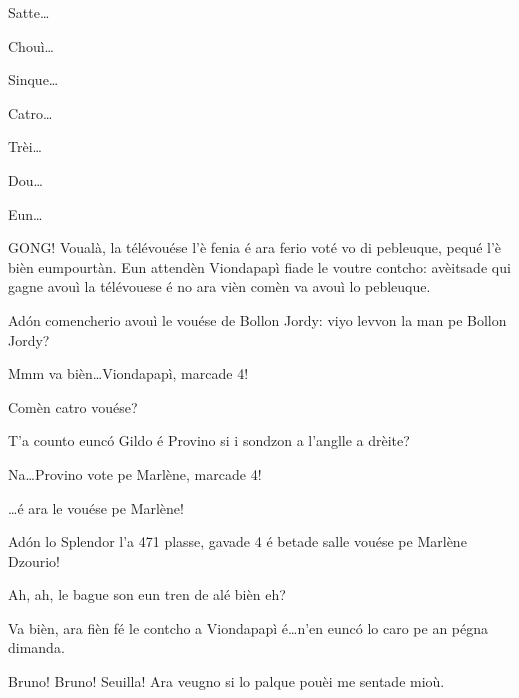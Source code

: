 \begin{drama}
\Noteospeaks Satte\ldots

\Brunospeaks Chouì\ldots

\Noteospeaks Sinque\ldots

\Brunospeaks Catro\ldots

\Noteospeaks Trèi\ldots

\Brunospeaks Dou\ldots

\Noteospeaks Eun\ldots


\Brunospeaks GONG! Voualà, la télévouése l'è fenia é ara ferio voté vo di pebleuque, pequé l'è bièn eumpourtàn. Eun attendèn Viondapapì fiade le voutre contcho: avèitsade qui gagne avouì la télévouese é no ara vièn comèn va avouì lo pebleuque.


\Brunospeaks {} Ad\'on comencherio avouì le vouése de Bollon Jordy: viyo levvon la man pe Bollon Jordy?


\Brunospeaks Mmm va bièn\ldots Viondapapì, marcade 4!

\Jordyspeaks Comèn catro vouése?

\Noteospeaks {} T'a counto eunc\'o Gildo é Provino si i sondzon a l'anglle a drèite?

\Brunospeaks Na\ldots Provino vote pe Marlène, marcade 4!

\Brunospeaks \ldots é ara le vouése pe Marlène!


\Brunospeaks  {} Ad\'on lo Splendor l'a 471 plasse, gavade 4 é betade salle vouése pe Marlène Dzourio!

\Brunospeaks {} Ah, ah, le bague son eun tren de alé bièn eh?

\Brunospeaks Va bièn, ara fièn fé le contcho a Viondapapì é\ldots n'en eunc\'o lo caro pe an pégna dimanda.


\Fattorinospeaks Bruno! Bruno! Seuilla! Ara veugno si lo palque pouèi me sentade mioù.


\end{drama}
